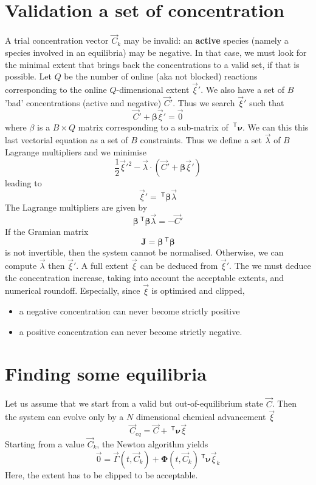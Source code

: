 \documentclass[aps]{revtex4}
\newcommand{\mymat}[1]{\bm{#1}}
\newcommand{\mytrn}[1]{~^{\mathsf{T}}{#1}}
\begin{document}
\section{Validation a set of concentration}
A trial concentration vector $\vec{C}_k$ may be invalid: an \textbf{active} species (namely a species involved in an equilibria)
may be negative. In that case, we must look for the minimal extent that brings back the concentrations to a valid set, if that
is possible.
Let $Q$ be the number of online (aka not blocked) reactions corresponding 
to the online $Q$-dimensional extent $\vec{\xi}'$. We also have a set of $B$ 'bad' concentrations (active and negative) $\vec{C}'$.
Thus we search $\vec{\xi}'$ such that
$$
	\vec{C}' + \mymat{\beta} \vec{\xi}' = \vec{0}
$$
where $\beta$ is a $B\times Q$ matrix corresponding to a sub-matrix of $\mytrn{\mymat{\nu}}$.
We can this this last vectorial equation as a set of $B$ constraints. Thus we define a set
$\vec{\lambda}$ of $B$ Lagrange multipliers and we minimise
$$
	\dfrac{1}{2} \vec{\xi}'^2 - \vec{\lambda}\cdot\left(\vec{C}' + \mymat{\beta} \vec{\xi}'\right)
$$
leading to
$$
	\vec{\xi}' = \mytrn{\mymat{\beta}}\vec{\lambda}
$$
The Lagrange multipliers are given by
$$
	\mymat{\beta}\mytrn{\mymat{\beta}} \vec{\lambda} = -\vec{C}'
$$
If the Gramian matrix 
$$
	\mymat{J} = \mymat{\beta}\mytrn{\mymat{\beta}}
$$	
is not invertible, then the system cannot be normalised.
Otherwise, we can compute $\vec{\lambda}$ then 
$\vec{\xi}'$.
A full extent $\vec{\xi}$ can be deduced from $\vec{\xi}'$.
The we must deduce the concentration increase, taking into account the acceptable extents,
and numerical roundoff.
Especially, since $\vec{\xi}$ is optimised and clipped,
\begin{itemize}
\item a negative concentration can never become strictly positive
\item a positive concentration can never become strictly negative.
\end{itemize}
                 

\section{Finding some equilibria}

Let us assume that we start from a valid but out-of-equilibrium state $\vec{C}$.
Then the system can evolve only by a $N$ dimensional chemical advancement $\vec{\xi}$
\begin{equation}
	\vec{C}_{eq} = \vec{C} + \mytrn{\mymat{\nu}}\vec{\xi}
\end{equation}
Starting from a value $\vec{C}_{k}$, the Newton algorithm yields
\begin{equation}
	\vec{0} = \vec{\Gamma}(t,\vec{C}_k) + \mymat{\Phi}(t,\vec{C}_k) \mytrn{\mymat{\nu}}\vec{\xi}_k
\end{equation}
Here, the extent has to be clipped to be acceptable.
\end{document}
